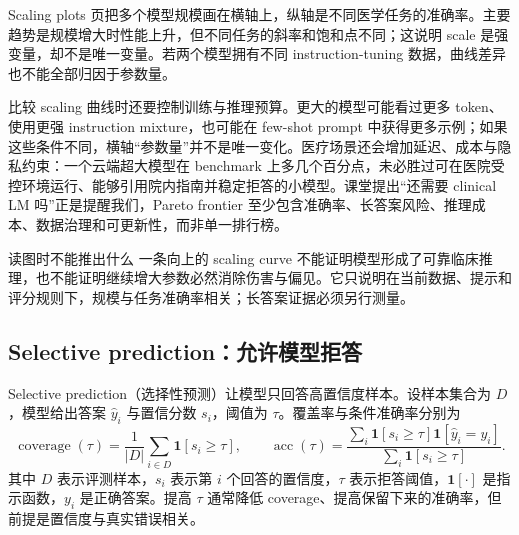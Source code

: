 

Scaling plots 页把多个模型规模画在横轴上，纵轴是不同医学任务的准确率。主要趋势是规模增大时性能上升，但不同任务的斜率和饱和点不同；这说明 scale 是强变量，却不是唯一变量。若两个模型拥有不同 instruction-tuning 数据，曲线差异也不能全部归因于参数量。


比较 scaling 曲线时还要控制训练与推理预算。更大的模型可能看过更多 token、使用更强 instruction mixture，也可能在 few-shot prompt 中获得更多示例；如果这些条件不同，横轴“参数量”并不是唯一变化。医疗场景还会增加延迟、成本与隐私约束：一个云端超大模型在 benchmark 上多几个百分点，未必胜过可在医院受控环境运行、能够引用院内指南并稳定拒答的小模型。课堂提出“还需要 clinical LM 吗”正是提醒我们，Pareto frontier 至少包含准确率、长答案风险、推理成本、数据治理和可更新性，而非单一排行榜。

\begin{warningbox}{读图时不能推出什么}
一条向上的 scaling curve 不能证明模型形成了可靠临床推理，也不能证明继续增大参数必然消除伤害与偏见。它只说明在当前数据、提示和评分规则下，规模与任务准确率相关；长答案证据必须另行测量。
\end{warningbox}

\subsection{Selective prediction：允许模型拒答}

Selective prediction（选择性预测）让模型只回答高置信度样本。设样本集合为 $D$，模型给出答案 $\hat y_i$ 与置信分数 $s_i$，阈值为 $\tau$。覆盖率与条件准确率分别为
$$
\operatorname{coverage}(\tau)=\frac{1}{|D|}\sum_{i\in D}\mathbf{1}[s_i\ge\tau],
\qquad
\operatorname{acc}(\tau)=
\frac{\sum_i\mathbf{1}[s_i\ge\tau]\mathbf{1}[\hat y_i=y_i]}
{\sum_i\mathbf{1}[s_i\ge\tau]}.
$$
其中 $D$ 表示评测样本，$s_i$ 表示第 $i$ 个回答的置信度，$\tau$ 表示拒答阈值，$\mathbf{1}[\cdot]$ 是指示函数，$y_i$ 是正确答案。提高 $\tau$ 通常降低 coverage、提高保留下来的准确率，但前提是置信度与真实错误相关。


